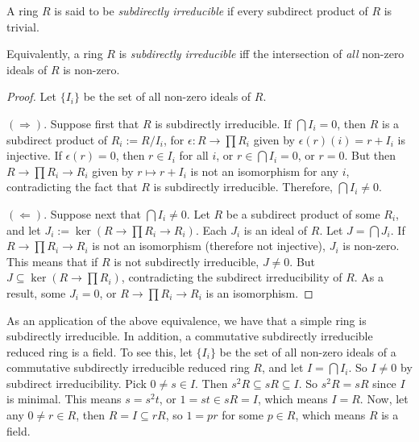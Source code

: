 \documentclass[12pt]{article}
\begin{document}

A ring $R$ is said to be {\em subdirectly irreducible} if every subdirect product  of $R$ is trivial.  

Equivalently, a ring $R$ is {\em subdirectly irreducible} iff the intersection of \emph{all} non-zero ideals of $R$ is non-zero.
\begin{proof}  Let $\lbrace I_i\rbrace$ be the set of all non-zero ideals of $R$.

$(\Rightarrow)$.  Suppose first that $R$ is subdirectly irreducible.  If $\bigcap I_i=0$, then $R$ is a subdirect product of $R_i:=R/I_i$, for $\epsilon: R\to \prod R_i$ given by $\epsilon(r)(i)=r+I_i$ is injective.  If $\epsilon(r)=0$, then $r\in I_i$ for all $i$, or $r\in \bigcap I_i=0$, or $r=0$.  But then $R\to \prod R_i\to R_i$ given by $r\mapsto r+I_i$ is not an isomorphism for any $i$, contradicting the fact that $R$ is subdirectly irreducible.  Therefore, $\bigcap I_i\ne 0$.

$(\Leftarrow)$.  Suppose next that $\bigcap I_i\ne 0$.  Let $R$ be a subdirect product of some $R_i$, and let $J_i:=\ker(R\to \prod R_i\to R_i)$.  Each $J_i$ is an ideal of $R$.  Let $J=\bigcap J_i$.  If $R\to \prod R_i\to R_i$ is not an isomorphism (therefore not injective), $J_i$ is non-zero.  This means that if $R$ is not subdirectly irreducible, $J\ne 0$.  But $J\subseteq \ker(R\to \prod R_i)$, contradicting the subdirect irreducibility of $R$.  As a result, some $J_i=0$, or $R\to \prod R_i \to R_i$ is an isomorphism.
\end{proof}

As an application of the above equivalence, we have that a simple ring is subdirectly irreducible.  In addition, a commutative subdirectly irreducible reduced ring is a field.  To see this, let $\lbrace I_i\rbrace$ be the set of all non-zero ideals of a commutative subdirectly irreducible reduced ring $R$, and let $I=\bigcap I_i$.  So $I\ne 0$ by subdirect irreducibility.  Pick $0\ne s\in I$.  Then $s^2R\subseteq sR\subseteq I$.  So $s^2R=sR$ since $I$ is minimal.  This means $s=s^2t$, or $1=st\in sR=I$, which means $I=R$.  Now, let any $0\ne r\in R$, then $R=I\subseteq rR$, so $1=pr$ for some $p\in R$, which means $R$ is a field.
\end{document}
